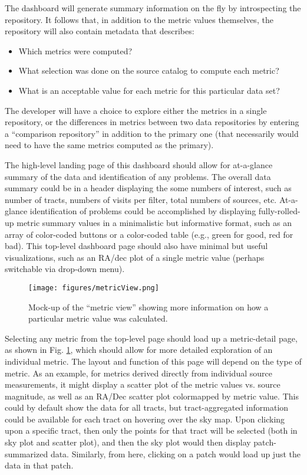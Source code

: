 The dashboard will generate summary information on the fly by introspecting the repository.
It follows that, in addition to the metric values themselves, the repository will also contain metadata that describes:
\begin{itemize}
    \item{Which metrics were computed?}
    \item{What selection was done on the source catalog to compute each metric?}
    \item{What is an acceptable value for each metric for this particular data set?}
\end{itemize}
The developer will have a choice to explore either the metrics in a single repository, or the differences in metrics between two data repositories by entering a ``comparison repository'' in addition to the primary one (that necessarily would need to have the same metrics computed as the primary).

The high-level landing page of this dashboard should allow for at-a-glance summary of the data and identification of any problems.
The overall data summary could be in a header displaying the some numbers of interest, such as number of tracts, numbers of visits per filter, total numbers of sources, etc.
At-a-glance identification of problems could be accomplished by displaying fully-rolled-up metric summary values in a minimalistic but informative format, such as an array of color-coded buttons or a color-coded table (e.g., green for good, red for bad).
This top-level dashboard page should also have minimal but useful visualizations, such as an RA/dec plot of a single metric value (perhaps switchable via drop-down menu).

\begin{figure}
  \begin{center}
    \texttt{[image: figures/metricView.png]}
  \end{center}
  \caption{
    Mock-up of the ``metric view'' showing more information on how a particular metric value was calculated.
  }
  \label{fig:comp:drill:metric}
\end{figure}

Selecting any metric from the top-level page should load up a metric-detail page, as shown in Fig. \ref{fig:comp:drill:metric}, which should allow for more detailed exploration of an individual metric.
The layout and function of this page will depend on the type of metric.
As an example, for metrics derived directly from individual source measurements, it might display a scatter plot of the metric values vs. source magnitude, as well as an RA/Dec scatter plot colormapped by metric value.
This could by default show the data for all tracts, but tract-aggregated information could be available for each tract on hovering over the sky map.
Upon clicking upon a specific tract, then only the points for that tract will be selected (both in sky plot and scatter plot), and then the sky plot would then display patch-summarized data.
Similarly, from here, clicking on a patch would load up just the data in that patch.

